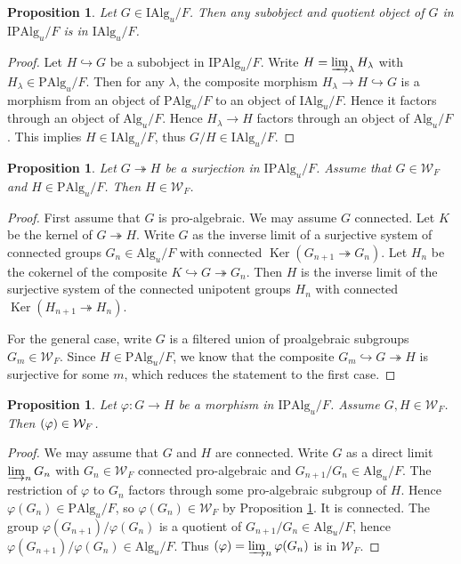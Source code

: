 \documentclass{amsart}
\newtheorem{Prop}[Thm]{Proposition}
\theoremstyle{remark}
\numberwithin{equation}{section}
\newcommand{\into}{\hookrightarrow}
\newcommand{\onto}{\twoheadrightarrow}
\newcommand{\dirlim}{\varinjlim}
\newcommand{\Alg}{\mathrm{Alg}}
\newcommand{\Ind}{\mathrm{I}}
\newcommand{\Pro}{\mathrm{P}}
\DeclareMathOperator{\Ker}{Ker}
\let\Im\relax
\DeclareMathOperator{\Im}{Im}
\begin{document}
\begin{Prop} \label{0024}
	Let $G \in \Ind \Alg_{u} / F$.
	Then any subobject and quotient object of $G$ in $\Ind \Pro \Alg_{u} / F$
	is in $\Ind \Alg_{u} / F$.
\end{Prop}

\begin{proof}
	Let $H \into G$ be a subobject in $\Ind \Pro \Alg_{u} / F$.
	Write $H = \dirlim_{\lambda} H_{\lambda}$ with $H_{\lambda} \in \Pro \Alg_{u} / F$.
	Then for any $\lambda$,
	the composite morphism $H_{\lambda} \to H \into G$ is a morphism
	from an object of $\Pro \Alg_{u} / F$ to an object of $\Ind \Alg_{u} / F$.
	Hence it factors through an object of $\Alg_{u} / F$.
	Hence $H_{\lambda} \to H$ factors through an object of $\Alg_{u} / F$.
	This implies $H \in \Ind \Alg_{u} / F$,
	thus $G / H \in \Ind \Alg_{u} / F$.
\end{proof}

\begin{Prop} \label{0047}
	Let $G \onto H$ be a surjection in $\Ind \Pro \Alg_{u} / F$.
	Assume that $G \in \mathcal{W}_{F}$ and $H \in \Pro \Alg_{u} / F$.
	Then $H \in \mathcal{W}_{F}$.
\end{Prop}

\begin{proof}
	First assume that $G$ is pro-algebraic.
	We may assume $G$ connected.
	Let $K$ be the kernel of $G \onto H$.
	Write $G$ as the inverse limit of a surjective system of connected groups $G_{n} \in \Alg_{u} / F$
	with connected $\Ker(G_{n + 1} \onto G_{n})$.
	Let $H_{n}$ be the cokernel of the composite $K \into G \onto G_{n}$.
	Then $H$ is the inverse limit of the surjective system of the connected unipotent groups $H_{n}$
	with connected $\Ker(H_{n + 1} \onto H_{n})$.
	
	For the general case, write $G$ is a filtered union of proalgebraic subgroups $G_{m} \in \mathcal{W}_{F}$.
	Since $H \in \Pro \Alg_{u} / F$,
	we know that the composite $G_{m} \into G \onto H$ is surjective for some $m$,
	which reduces the statement to the first case.
\end{proof}

\begin{Prop} \label{0089}
	Let $\varphi \colon G \to H$ be a morphism in $\Ind \Pro \Alg_{u} / F$.
	Assume $G, H \in \mathcal{W}_{F}$.
	Then $\Im(\varphi) \in \mathcal{W}_{F}$.
\end{Prop}

\begin{proof}
	We may assume that $G$ and $H$ are connected.
	Write $G$ as a direct limit $\dirlim_{n} G_{n}$
	with $G_{n} \in \mathcal{W}_{F}$ connected pro-algebraic
	and $G_{n + 1} / G_{n} \in \Alg_{u} / F$.
	The restriction of $\varphi$ to $G_{n}$ factors through some pro-algebraic subgroup of $H$.
	Hence $\varphi(G_{n}) \in \Pro \Alg_{u} / F$,
	so $\varphi(G_{n}) \in \mathcal{W}_{F}$ by Proposition \ref{0047}.
	It is connected.
	The group $\varphi(G_{n + 1}) / \varphi(G_{n})$ is a quotient of $G_{n + 1} / G_{n} \in \Alg_{u} / F$,
	hence $\varphi(G_{n + 1}) / \varphi(G_{n}) \in \Alg_{u} / F$.
	Thus $\Im(\varphi) = \dirlim_{n} \varphi(G_{n})$ is in $\mathcal{W}_{F}$.
\end{proof}
\end{document}
